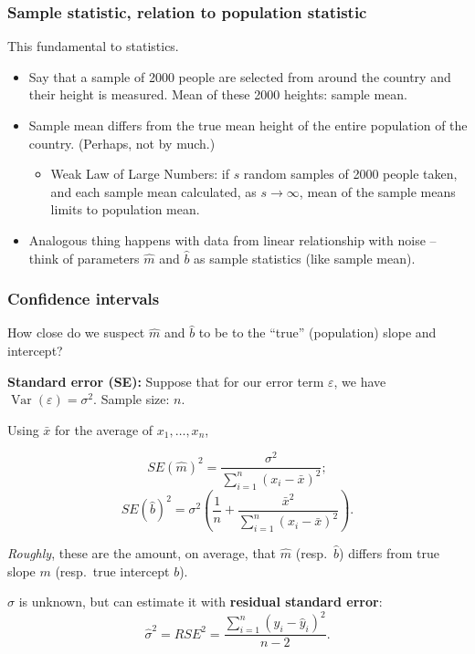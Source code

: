 \documentclass{beamer}
\theoremstyle{example}
\begin{document}
\begin{frame}
\frametitle{Sample statistic, relation to population statistic}
This fundamental to statistics. 
\begin{itemize}
    \item Say that a sample of 2000 people are selected from around the country and their height is measured. Mean of these 2000 heights: sample mean.
    \pause
    \item Sample mean differs from the true mean height of the entire population of the country. (Perhaps, not by much.)
    \begin{itemize}
        \item Weak Law of Large Numbers: if $s$ random samples of 2000 people taken, and each sample mean calculated, as $s\to\infty$, mean of the sample means limits to population mean.
    \end{itemize}
    \pause
    \item Analogous thing happens with data from linear relationship with noise {--} think of parameters $\hat{m}$ and $\hat{b}$ as sample statistics (like sample mean).
\end{itemize}

\end{frame}

\begin{frame}
\frametitle{Confidence intervals}
How close do we suspect $\hat{m}$ and $\hat{b}$ to be to the ``true'' (population) slope and intercept?

\pause
\textbf{Standard error (SE):}  Suppose that for our error term $\varepsilon$, we have $\operatorname{Var}(\varepsilon) = \sigma^2$. Sample size: $n$.

\pause
Using $\bar{x}$ for the average of $x_1,\ldots,x_n$,

\[SE(\hat{m})^2 = \frac{\sigma^2}{\sum_{i=1}^n(x_i - \bar{x})^2};\]
\[SE(\hat{b})^2 = \sigma^2\left(\frac1{n} + \frac{\bar{x}^2}{\sum_{i=1}^n(x_i - \bar{x})^2}\right).\]

\pause
\emph{Roughly}, these are the amount, on average, that $\hat{m}$ (resp.\ $\hat{b}$) differs from true slope $m$ (resp.\ true intercept $b$).

\pause
$\sigma$ is unknown, but can estimate it with \textbf{residual standard error}:
    \[\hat{\sigma}^2 = RSE^2 = \frac{\sum_{i=1}^n(y_i - \hat{y}_i)^2}{n-2}.\]

\end{frame}
\end{document}
